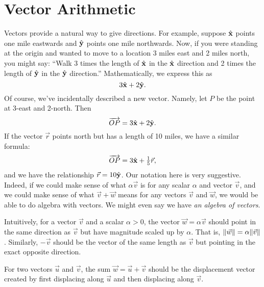 \section{Vector Arithmetic}
Vectors provide a natural way to give directions.
For example, suppose ${\hat {\mathbf x}}$ points one mile eastwards and ${\hat {\mathbf y}}$
points one mile northwards.  Now, if you were standing at the origin
and wanted to move to a location 3 miles east and 2 miles north, you might say:
``Walk 3 times the length of ${\hat {\mathbf x}}$  in the ${\hat {\mathbf x}}$ direction and 2 times
the length of ${\hat {\mathbf y}}$ in the ${\hat {\mathbf y}}$ direction.''  Mathematically, we express this
as
\[
	3{\hat {\mathbf x}}+2{\hat {\mathbf y}}.
\]
Of course, we've incidentally described a new vector.  Namely, let $P$
be the point at 3-east and 2-north.  Then
\[
	\overrightarrow{OP}=3{\hat {\mathbf x}}+2{\hat {\mathbf y}}.
\]
If the vector $\vec r$ points north but has a length of 10 miles, we have
a similar formula:
\[
	\overrightarrow{OP}=3{\hat {\mathbf x}}+\tfrac{1}{5}\vec r,
\]
and we have the relationship $\vec r=10{\hat {\mathbf y}}$.
Our notation here is very suggestive.  Indeed, if we could make
sense of what $\alpha\vec v$ is for any scalar $\alpha$ and vector
$\vec v$, and we could make sense of what $\vec v+\vec w$
means for any vectors $\vec v$ and $\vec w$, we would be able to
do algebra with vectors.  We might even say we have \emph{an algebra
of vectors}.

Intuitively, for a vector $\vec v$ and a scalar $\alpha>0$, the
vector $\vec w=\alpha\vec v$ should point in the same direction as
$\vec v$ but have magnitude scaled up by $\alpha$.  That is, $\lVert\vec w\rVert=\alpha\lVert\vec v\rVert$.
Similarly, $-\vec v$ should be the vector of the same length as $\vec v$ but
pointing in the exact opposite direction.

\begin{center}
	\usetikzlibrary{patterns,decorations.pathreplacing}
\end{center}

For two vectors $\vec u$ and $\vec v$, the sum $\vec w=\vec u+\vec v$
should be the displacement vector created by first displacing along $\vec u$
and then displacing along $\vec v$.

